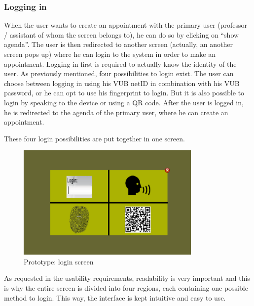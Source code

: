 \documentclass[11pt, a4paper,svglistings]{report}
\begin{document}

\newpage

\subsubsection{Logging in}

When the user wants to create an appointment with the primary user (professor / assistant of whom the screen belongs to), he can do so by clicking on ``show agenda''. The user is then redirected to another screen (actually, an another screen pops up) where he can login to the system in order to make an appointment. Logging in first is required to actually know the identity of the user. As previously mentioned, four possibilities to login exist. The user can choose between logging in using his VUB netID in combination with his VUB password, or he can opt to use his fingerprint to login. But it is also possible to login by speaking to the device or using a QR code. After the user is logged in, he  is redirected to the agenda of the primary user, where he can create an appointment.

These four login possibilities are put together in one screen.

\begin{figure}[H]
\centering
    \includegraphics[width=0.8\textwidth]{Prototypes/Login.png}
  \caption{Prototype: login screen}
\end{figure}
As requested in the usability requirements, readability is very important and this is why the entire screen is divided into four regions, each containing one possible method to login. This way, the interface is kept intuitive and easy to use.

\end{document}
